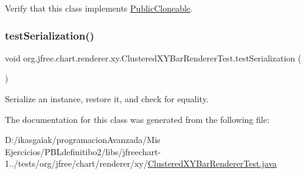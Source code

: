 Verify that this class implements \mbox{\hyperlink{}{Public\+Cloneable}}. \mbox{\label{classorg_1_1jfree_1_1chart_1_1renderer_1_1xy_1_1_clustered_x_y_bar_renderer_test_a79529cddc46d5910bd248fc159735bcd}} 
\subsubsection{\texorpdfstring{test\+Serialization()}{testSerialization()}}
{\footnotesize\ttfamily void org.\+jfree.\+chart.\+renderer.\+xy.\+Clustered\+X\+Y\+Bar\+Renderer\+Test.\+test\+Serialization (\begin{DoxyParamCaption}{ }\end{DoxyParamCaption})}

Serialize an instance, restore it, and check for equality. 

The documentation for this class was generated from the following file\+:\begin{DoxyCompactItemize}
\item 
D\+:/ikasgaiak/programacion\+Avanzada/\+Mis Ejercicios/\+P\+B\+Ldefinitibo2/libs/jfreechart-\/1../tests/org/jfree/chart/renderer/xy/\mbox{\hyperlink{_clustered_x_y_bar_renderer_test_8java}{Clustered\+X\+Y\+Bar\+Renderer\+Test.\+java}}\end{DoxyCompactItemize}
